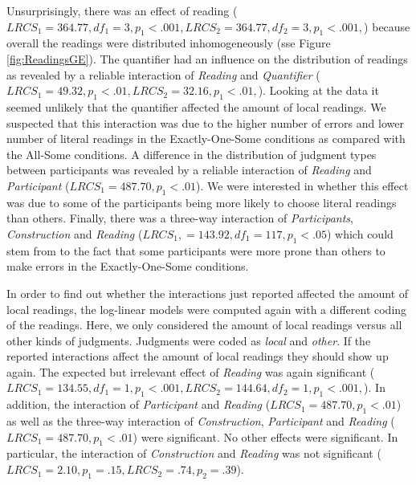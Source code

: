 \documentclass[fleqn,reqno,10pt,draft]{article}
\begin{document}
Unsurprisingly, there was an effect of reading ($LRCS_1=364.77, df_1 =
3, p_1<.001, LRCS_2=364.77, df_2 = 3, p_1<.001,$) because overall the
readings were distributed inhomogeneously (sse Figure
\ref{fig:ReadingsGE}). The quantifier had an influence on the
distribution of readings as revealed by a reliable interaction of {\it
  Reading} and {\it Quantifier} ($LRCS_1=49.32, p_1<.01,LRCS_2=32.16,
p_1<.01,$). Looking at the data it seemed unlikely that the quantifier
affected the amount of local readings. We suspected that this
interaction was due to the higher number of errors and lower number of
literal readings in the Exactly-One-Some conditions as compared with
the All-Some conditions. A difference in the distribution of judgment
types between participants was revealed by a reliable interaction of
{\it Reading} and {\it Participant} ($LRCS_1=487.70, p_1<.01$). We
were interested in whether this effect was due to some of the
participants being more likely to choose literal readings than
others. Finally, there was a three-way interaction of {\it
  Participants}, {\it Construction} and {\it Reading} ($LRCS_1, =
143.92, df_1 = 117, p_1<.05$) which could stem from to the fact that
some participants were more prone than others to make errors in the
Exactly-One-Some conditions.

In order to find out whether the interactions just reported affected
the amount of local readings, the log-linear models were computed
again with a different coding of the readings. Here, we only
considered the amount of local readings versus all other kinds of
judgments. Judgments were coded as {\it local} and {\it other}. If the
reported interactions affect the amount of local readings they should
show up again. The expected but irrelevant effect of {\it Reading} was
again significant ($LRCS_1=134.55, df_1 = 1, p_1<.001, LRCS_2=144.64,
df_2 = 1, p_1<.001,$). In addition, the interaction of {\it
  Participant} and {\it Reading} ($LRCS_1=487.70, p_1<.01$) as well as
the three-way interaction of {\it Construction}, {\it Participant} and
{\it Reading} ($LRCS_1=487.70, p_1<.01$) were significant. No other
effects were significant. In particular, the interaction of {\it
  Construction} and {\it Reading} was not significant ($LRCS_1=2.10,
p_1=.15,LRCS_2=.74, p_2=.39$).
\end{document}
